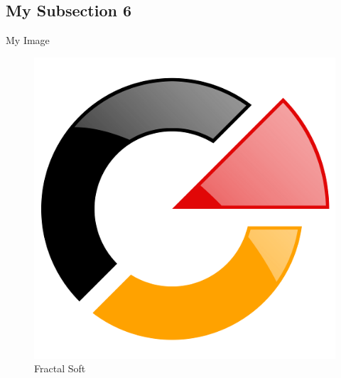 \documentclass[12pt]{beamer}
\begin{document}
\subsection{My Subsection 6}
\begin{frame}
  \begin{block}{My Image}
    \begin{figure}
      \centering
      \includegraphics{images/fractalsoft-logotype.png}
      \caption{Fractal Soft}
    \end{figure}
  \end{block}
\end{frame}
\end{document}

